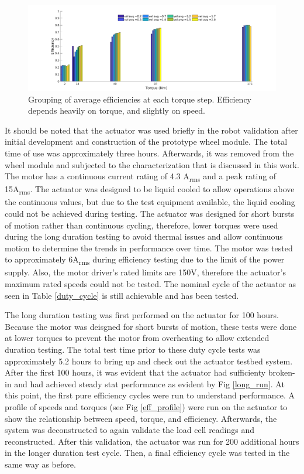 \begin{figure}[t]
	\centering
	\includegraphics[width=0.8\linewidth]{images/eff_final}
	\caption{Grouping of average efficiencies at each torque step.
		Efficiency depends heavily on torque, and slightly on speed.}
	\label{eff_results}
\end{figure}

It should be noted that the actuator was used briefly in the robot validation after initial development and construction of the prototype wheel module.
The total time of use was approximately three hours.
Afterwards, it was removed from the wheel module and subjected to the characterization that is discussed in this work.
The motor has a continuous current rating of 4.3 A\textsubscript{rms} and a peak rating of 15A\textsubscript{rms}.
The actuator was designed to be liquid cooled to allow operations above the continuous values, but due to the test equipment available, the liquid cooling could not be achieved during testing.
The actuator was designed for short bursts of motion rather than continuous cycling, therefore, lower torques were used during the long duration testing to avoid thermal issues and allow continuous motion to determine the trends in performance over time.
The motor was tested to approximately 6A\textsubscript{rms} during efficiency testing due to the limit of the power supply.
Also, the motor driver's rated limits are 150V, therefore the actuator's maximum rated speeds could not be tested.
The nominal cycle of the actuator as seen in Table \ref{duty_cycle} is still achievable and has been tested.

The long duration testing was first performed on the actuator for 100 hours. Because the motor was deisgned for short bursts of motion, these tests were done at lower torques to prevent the motor from overheating to allow extended duration testing. The total test time prior to these duty cycle tests was approximately 5.2 hours to bring up and check out the actuator testbed system.
After the first 100 hours, it was evident that the actuator had sufficienty broken-in and had achieved steady stat performance as evident by Fig \ref{long_run}. At this point, the first pure efficiency cycles were run to understand performance. A profile of speeds and torques (see Fig \ref{eff_profile}) were run on the actuator to show the relationship between speed, torque, and efficiency. Afterwards, the system was deconstructed to again validate the load cell readings and reconstructed.
After this validation, the actuator was run for 200 additional hours in the longer duration test cycle. Then, a final efficiency cycle was tested in the same way as before. 

